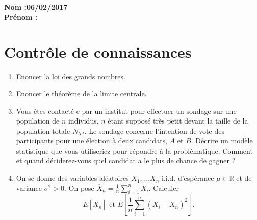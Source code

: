 \textbf{Nom :}\hfill \textbf{06/02/2017}\\
\textbf{Prénom :}

\section*{Contrôle de connaissances}

\begin{enumerate}
\item Enoncer la loi des grands nombres.
\item Enoncer le théorème de la limite centrale.
\item Vous êtes contacté-e par un institut pour effectuer un sondage sur une population de $n$ individus, $n$ étant supposé très petit devant la taille de la population totale $N_{tot}$. Le sondage concerne l'intention de vote des participants pour une élection à deux candidats, $A$ et $B$. Décrire un modèle statistique que vous utiliseriez pour répondre à la problématique. Comment et quand déciderez-vous quel candidat a le plus de chance de gagner ?
\item On se donne des variables aléatoires $X_1$,...,$X_n$ i.i.d. d'espérance $\mu\in\mathbb R$ et de variance $\sigma^2>0$. On pose $\overline X_n = \frac{1}{n}\sum_{i=1}^n X_i$. Calculer 
\[E[\overline X_n]\text{ et } E[\frac{1}{n}\sum_{i=1}^n (X_i-\overline X_n)^2].\]
\end{enumerate}
